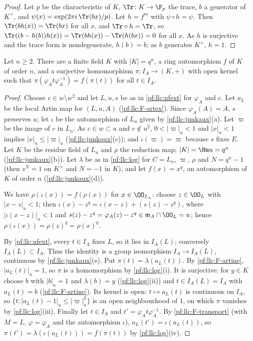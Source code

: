 \begin{proof}
Let $p$ be the characteristic of $K$, $\Tr\colon K\to\F_p$ the trace, $b$ a generator of $K^\times$, and
$\psi(x)=\exp(2\pi i\,\Tr(bx)/p)$. Let $h=f^m$ with $\psi\circ h=\psi$. Then $\Tr(bh(x))=\Tr(bx)$ for all $x$, and
$\Tr\circ h=\Tr$, so $\Tr((b-h(b))h(x))=\Tr(bh(x))-\Tr(h(bx))=0$ for all $x$. As $h$ is surjective and the trace form is
nondegenerate, $h(b)=b$; as $b$ generates $K^\times$, $h=1$.
\end{proof}

\begin{lemma}\label{pf:llc:junkdata}
Let $n\ge2$. There are a finite field $K$ with $|K|=q^n$, a ring automorphism $f$ of $K$ of order $n$, and a surjective
homomorphism $\pi\colon I_A\to(K,+)$ with open kernel such that $\pi(\varphi_At\varphi_A^{-1})=f(\pi(t))$ for all $t\in I_A$.
\end{lemma}

\begin{proof}
Choose $c\in w\setminus w^2$ and let $L,u,s$ be as in \cref{pf:llc:nfext} for $\varphi_A$ and $c$. Let $a_L$ be the local
Artin map for $(L,u,A)$ (\ref{pf:llc:F-artex}). Since $\varphi_A(A)=A$, $s$ preserves $u$; let $\iota$ be the automorphism
of $L_u$ given by \cref{pf:llc:junkaux}(a). Let $\varpi$ be the image of $c$ in $L_u$. As $c\in w\subset u$ and $c\notin u^2$,
$0<|\varpi|_u<1$ and $|x|_u<1$ implies $|x|_u\le|\varpi|_u$ (\cref{pf:llc:junkaux}(c)); and $\iota(\varpi)=\varpi$ because $s$
fixes $E$. Let $K$ be the residue field of $L_u$ and $\rho$ the reduction map; $|K|=\Nm u=q^n$
(\cref{pf:llc:junkaux}(b)). Let $\lambda$ be as in \cref{pf:llc:log} for $C=L_u$, $\varpi$, $\rho$ and $N=q^n-1$ (then
$z^N=1$ on $K^\times$ and $N=-1$ in $K$), and let $f(x)=x^q$, an automorphism of $K$ of order $n$
(\cref{pf:llc:junkaux}(d)).

We have $\rho(\iota(x))=f(\rho(x))$ for $x\in\OO_{L_u}$: choose $z\in\OO_L$ with $|x-z|_u<1$; then
$\iota(x)-z^q=\iota(x-z)+(s(z)-z^q)$, where $|\iota(x-z)|_u<1$ and $s(z)-z^q=\varphi_A(z)-z^q\in\llcm_A\cap\OO_L=u$; hence
$\rho(\iota(x))=\rho(z)^q=\rho(x)^q$.

By \cref{pf:llc:nfext}, every $t\in I_A$ fixes $L$, so it lies in $I_A(L)$; conversely $I_A(L)\subset I_A$. Thus the
identity is a group isomorphism $I_A\to I_A(L)$, continuous by \cref{pf:llc:junkaux}(e). Put $\pi(t)=\lambda(a_L(t))$.
By \ref{pf:llc:F-artine}, $|a_L(t)|_u=1$, so $\pi$ is a homomorphism by \cref{pf:llc:log}(i). It is surjective: for $y\in K$
choose $b$ with $|b|_u=1$ and $\lambda(b)=y$ (\cref{pf:llc:log}(ii)) and $t\in I_A(L)=I_A$ with $a_L(t)=b$
(\ref{pf:llc:F-artine}). Its kernel is open: $t\mapsto a_L(t)$ is continuous on $I_A$, so
$\{t:|a_L(t)-1|_u\le|\varpi|_u^2\}$ is an open neighbourhood of $1$, on which $\pi$ vanishes by \cref{pf:llc:log}(iii).
Finally let $t\in I_A$ and $t'=\varphi_At\varphi_A^{-1}$. By \ref{pf:llc:F-transport} (with $M=L$, $\varphi=\varphi_A$ and the
automorphism $\iota$), $a_L(t')=\iota(a_L(t))$, so $\pi(t')=\lambda(\iota(a_L(t)))=f(\pi(t))$ by \cref{pf:llc:log}(iv).
\end{proof}

